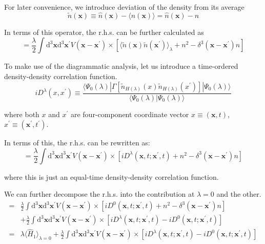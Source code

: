For later convenience, we introduce deviation of the density from its average
\[ \tilde{n}(\mathbf{x})\equiv \hat{n}(\mathbf{x}) - \langle \hat{n}(\mathbf{x}) \rangle = \hat{n}(\mathbf{x})-n \]

In terms of this operator, the r.h.s. can be further calculated as
\[= \frac{\lambda}{2}\int \mathrm{d}^3\mathbf{x}\mathrm{d}^3\mathbf{x}^{'}
V(\mathbf{x}-\mathbf{x}^{'})\times \left[ \langle \tilde{n}(\mathbf{x})\tilde{n}(\mathbf{x}^{'}) \rangle_{\lambda} + n^2-\delta^3(\mathbf{x}-\mathbf{x}^{'}) n \right]
\]

To make use of the diagrammatic analysis, let us introduce a time-ordered density-density correlation function.
\begin{equation} \label{Eqs2.8.2}
i D^\lambda(x,x^{'}) \equiv \frac{\langle \Psi_0(\lambda)|\Gamma[\tilde{n}_{H(\lambda)}(x)\tilde{n}_{H(\lambda)}(x^{'})]|\Psi_0(\lambda) \rangle}{\langle \Psi_0(\lambda)|\Psi_0(\lambda) \rangle}
\end{equation}

where both $x$ and $x^{'}$ are four-component coordinate vector $x\equiv(\mathbf{x},t)$, $x^{'}\equiv(\mathbf{x}^{'},t^{'})$.

In terms of this, the r.h.s. can be rewritten as:
\[= \frac{\lambda}{2}\int \mathrm{d}^3\mathbf{x}\mathrm{d}^3\mathbf{x}^{'}
V(\mathbf{x}-\mathbf{x}^{'})\times \left[ i D^\lambda(\mathbf{x},t;\mathbf{x}^{'},t) + n^2-\delta^3(\mathbf{x}-\mathbf{x}^{'}) n \right]
\]

where this is just an equal-time density-density correlation function.

We can further decompose the r.h.s. into the contribution at $\lambda=0$ and the other.
\[ \begin{split}=& \frac{\lambda}{2}\int \mathrm{d}^3\mathbf{x}\mathrm{d}^3\mathbf{x}^{'}
V(\mathbf{x}-\mathbf{x}^{'})\times \left[ i D^0(\mathbf{x},t;\mathbf{x}^{'},t) + n^2-\delta^3(\mathbf{x}-\mathbf{x}^{'}) n \right]\\
&+\frac{\lambda}{2}\int \mathrm{d}^3\mathbf{x}\mathrm{d}^3\mathbf{x}^{'}
V(\mathbf{x}-\mathbf{x}^{'})\times \left[ i D^\lambda(\mathbf{x},t;\mathbf{x}^{'},t) -  i D^0(\mathbf{x},t;\mathbf{x}^{'},t) \right]\\
=& \lambda \langle \hat{H}_1 \rangle_{\lambda=0} + \frac{\lambda}{2}\int \mathrm{d}^3\mathbf{x}\mathrm{d}^3\mathbf{x}^{'}
V(\mathbf{x}-\mathbf{x}^{'})\times \left[ i D^\lambda(\mathbf{x},t;\mathbf{x}^{'},t) -  i D^0(\mathbf{x},t;\mathbf{x}^{'},t) \right]
\end{split}\]

